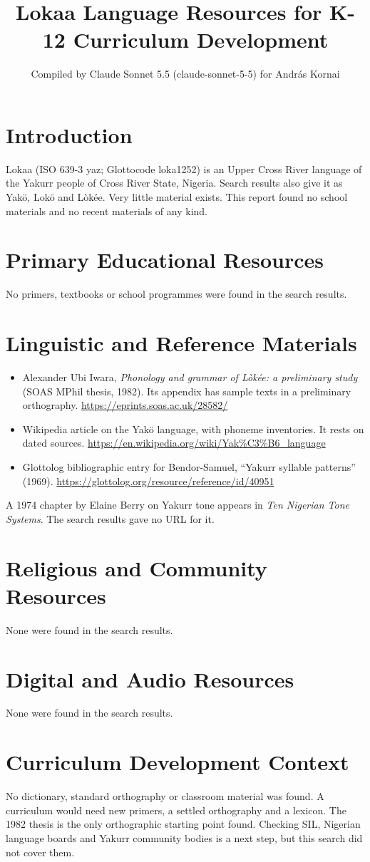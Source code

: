 \documentclass[12pt]{article}
\title{Lokaa Language Resources for K-12 Curriculum Development}
\author{Compiled by Claude Sonnet 5.5 (claude-sonnet-5-5) for Andr\'as Kornai}
\date{}
\begin{document}
\maketitle

\section{Introduction}
Lokaa (ISO 639-3 yaz; Glottocode loka1252) is an Upper Cross River language of the Yakurr people of Cross River State, Nigeria. Search results also give it as Yak\"o, Lok\"o and L\`ok\'ee. Very little material exists. This report found no school materials and no recent materials of any kind.

\section{Primary Educational Resources}
No primers, textbooks or school programmes were found in the search results.

\section{Linguistic and Reference Materials}
\begin{itemize}
\item Alexander Ubi Iwara, \emph{Phonology and grammar of L\`ok\'ee: a preliminary study} (SOAS MPhil thesis, 1982). Its appendix has sample texts in a preliminary orthography. \url{https://eprints.soas.ac.uk/28582/}
\item Wikipedia article on the Yak\"o language, with phoneme inventories. It rests on dated sources. \url{https://en.wikipedia.org/wiki/Yak%C3%B6_language}
\item Glottolog bibliographic entry for Bendor-Samuel, ``Yakurr syllable patterns'' (1969). \url{https://glottolog.org/resource/reference/id/40951}
\end{itemize}
A 1974 chapter by Elaine Berry on Yakurr tone appears in \emph{Ten Nigerian Tone Systems}. The search results gave no URL for it.

\section{Religious and Community Resources}
None were found in the search results.

\section{Digital and Audio Resources}
None were found in the search results.

\section{Curriculum Development Context}
No dictionary, standard orthography or classroom material was found. A curriculum would need new primers, a settled orthography and a lexicon. The 1982 thesis is the only orthographic starting point found. Checking SIL, Nigerian language boards and Yakurr community bodies is a next step, but this search did not cover them.
\end{document}
